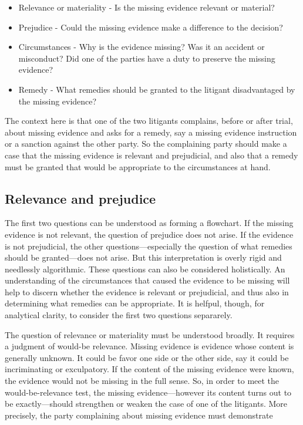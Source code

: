 \documentclass[
  10pt,
  dvipsnames,enabledeprecatedfontcommands]{scrartcl}
\begin{document}
\begin{itemize}
\item[] Relevance or materiality - Is the missing evidence relevant or material?
\item[] Prejudice - Could the missing evidence make a difference to the decision?
\item[] Circumstances - Why is the evidence missing? Was it an accident or misconduct? Did one of the parties have a duty to preserve the missing evidence?
\item[] Remedy - What remedies should be granted to the litigant disadvantaged 
by the missing evidence?
\end{itemize}

\noindent The context here is that one of the two litigants complains,
before or after trial, about missing evidence and asks for a remedy, say
a missing evidence instruction or a sanction against the other party. So
the complaining party should make a case that the missing evidence is
relevant and prejudicial, and also that a remedy must be granted that
would be appropriate to the circumstances at hand.

\hypertarget{relevance-and-prejudice}{%
\subsection{Relevance and prejudice}\label{relevance-and-prejudice}}

The first two questions can be understood as forming a flowchart. If the
missing evidence is not relevant, the question of prejudice does not
arise. If the evidence is not prejudicial, the other
questions---especially the question of what remedies should be
granted---does not arise. But this interpretation is overly rigid and
needlessly algorithmic. These questions can also be considered
holistically. An understanding of the circumstances that caused the
evidence to be missing will help to discern whether the evidence is
relevant or prejudicial, and thus also in determining what remedies can
be appropriate. It is helfpul, though, for analytical clarity, to
consider the first two questions separarely.

The question of relevance or materiality must be understood broadly. It
requires a judgment of would-be relevance. Missing evidence is evidence
whose content is generally unknown. It could be favor one side or the
other side, say it could be incriminating or exculpatory. If the content
of the missing evidence were known, the evidence would not be missing in
the full sense. So, in order to meet the would-be-relevance test, the
missing evidence---however its content turns out to be exactly---should
strengthen or weaken the case of one of the litigants. More precisely,
the party complaining about missing evidence must demonstrate
\end{document}
